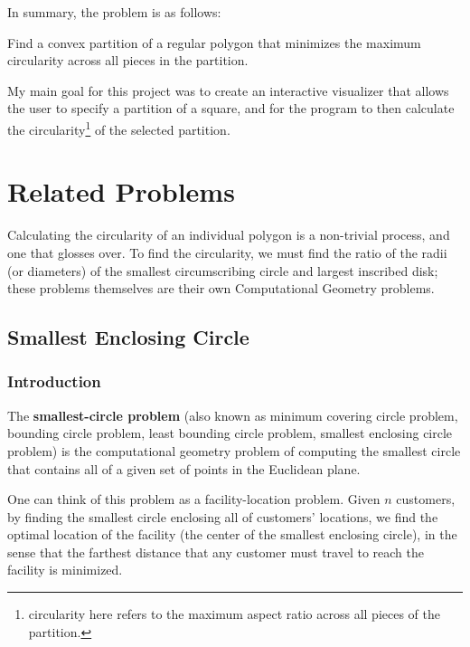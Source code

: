 \documentclass[11pt]{article}
\begin{document}
In summary, the problem is as follows:
\begin{goal*}Find a convex partition of a regular polygon that minimizes the maximum circularity across all pieces in the partition.
\end{goal*}

My main goal for this project was to create an interactive visualizer that allows the user to specify a partition of a square, and for the program to then calculate the circularity\footnote{circularity here refers to the maximum aspect ratio across all pieces of the partition.} of the selected partition.

\section{Related Problems}

Calculating the circularity of an individual polygon is a non-trivial process, and one that \cite{damian_rourke} glosses over.
To find the circularity, we must find the ratio of the radii (or diameters) of the smallest circumscribing circle and largest inscribed disk; these problems themselves are their own Computational Geometry problems.

\subsection{Smallest Enclosing Circle}
\subsubsection{Introduction}
\begin{definition}
The \textbf{smallest-circle problem} (also known as minimum covering circle problem, bounding circle problem, least bounding circle problem, smallest enclosing
circle problem) is the computational geometry problem of computing the smallest circle that contains all of a given set of points in the Euclidean plane. \\
\end{definition}

One can think of this problem as a facility-location problem. Given $n$ customers, by finding the smallest circle enclosing all of customers' locations, we find the optimal location
of the facility (the center of the smallest enclosing circle), in the sense that the farthest distance that any customer must travel to reach the facility is minimized.\\
\end{document}
